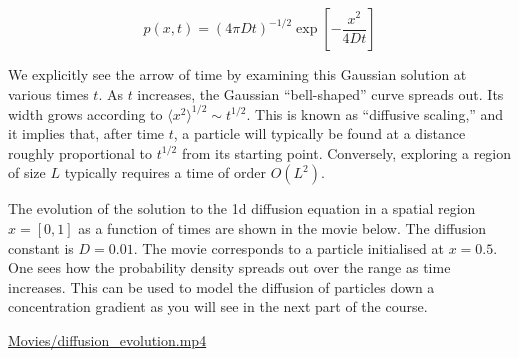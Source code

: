 \documentclass[
  letterpaper,
  enabledeprecatedfontcommands]{report}
\begin{document}
\[
p(x,t) = (4 \pi D t)^{-1/2} \exp\left[-\frac{x^2}{4 D t}\right]
\]

We explicitly see the arrow of time by examining this Gaussian solution
at various times \(t\). As \(t\) increases, the Gaussian ``bell-shaped''
curve spreads out. Its width grows according to
\(\langle x^2 \rangle^{1/2} \sim t^{1/2}\). This is known as ``diffusive
scaling,'' and it implies that, after time \(t\), a particle will
typically be found at a distance roughly proportional to \(t^{1/2}\)
from its starting point. Conversely, exploring a region of size \(L\)
typically requires a time of order \(O(L^2)\).

The evolution of the solution to the 1d diffusion equation in a spatial
region \(x=[0,1]\) as a function of times are shown in the movie below.
The diffusion constant is \(D=0.01\). The movie corresponds to a
particle initialised at \(x=0.5\). One sees how the probability density
spreads out over the range as time increases. This can be used to model
the diffusion of particles down a concentration gradient as you will see
in the next part of the course.

\url{Movies/diffusion_evolution.mp4}
\end{document}
